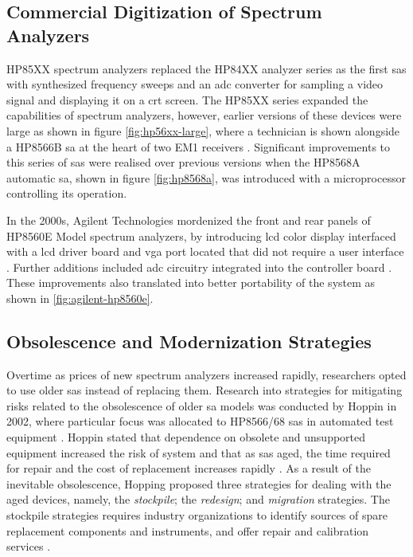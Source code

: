\documentclass[class=report,11pt,crop=false]{standalone}
\begin{document}
\subsection{Commercial Digitization of Spectrum Analyzers}

HP85XX spectrum analyzers replaced the HP84XX analyzer series as the first \acrshort{sa}s with synthesized frequency sweeps and an \acrshort{adc} converter for sampling a video signal and displaying it on a \acrshort{crt} screen. The HP85XX series expanded the capabilities of spectrum analyzers, however, earlier versions of these devices were large as shown in figure \ref{fig:hp56xx-large}, where a technician is shown alongside a HP8566B \acrshort{sa} at the heart of two EM1 receivers \cite{hp8566}. Significant improvements to this series of \acrshort{sa}s were realised over previous versions when the HP8568A automatic \acrshort{sa}, shown in figure \ref{fig:hp8568a}, was introduced with a microprocessor controlling its operation. 

In the 2000s, Agilent Technologies mordenized the front and rear panels of HP8560E Model spectrum analyzers,  by introducing \acrshort{lcd} color display interfaced with a \acrshort{lcd} driver board and \acrshort{vga} port located that did not require a user interface \cite{hp8560ec}. Further additions included \acrshort{adc} circuitry integrated into the controller board \cite{hp8560ec}. These improvements also translated into better portability of the system as shown in \ref{fig:agilent-hp8560e}. 

\subsection{Obsolescence and Modernization Strategies}

Overtime as prices of new spectrum analyzers increased rapidly, researchers opted to use older \acrshort{sa}s instead of replacing them. Research into strategies for mitigating risks related to the obsolescence of older \acrshort{sa} models was conducted by Hoppin in 2002, where particular focus was allocated to HP8566/68 \acrshort{sa}s in automated test equipment \cite{hoppin2002}. Hoppin stated that dependence on obsolete and unsupported equipment increased the risk of system and that as \acrshort{sa}s aged, the time required for repair and the cost of replacement increases rapidly \cite{hoppin2002}. As a result of the inevitable obsolescence, Hopping proposed three strategies for dealing with the aged devices, namely, the \textit{stockpile}; the \textit{redesign}; and \textit{migration} strategies. The stockpile strategies requires industry organizations to identify sources of spare replacement components and instruments, and offer repair and calibration services \cite{hoppin2002}. 
\end{document}
